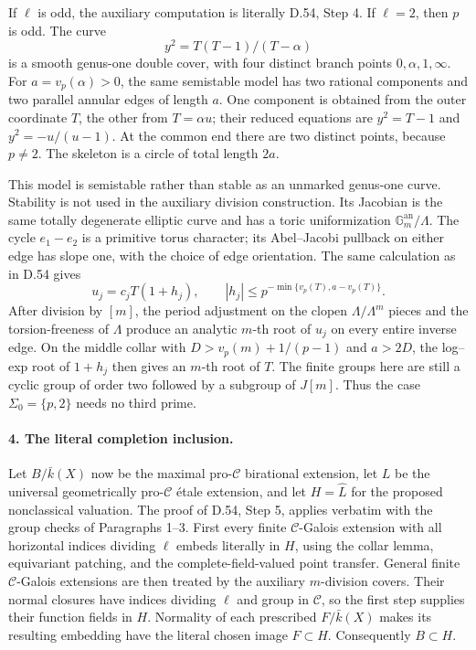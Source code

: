 If $\ell$ is odd, the auxiliary computation is literally D.54,
Step 4.  If $\ell=2$, then $p$ is odd.  The curve
\[
                    y^2=T(T-1)/(T-\alpha)
\]
is a smooth genus-one double cover, with four distinct branch
points $0,\alpha,1,\infty$.  For $a=v_p(\alpha)>0$, the same
semistable model has two rational components and two parallel
annular edges of length $a$.  One component is obtained from the
outer coordinate $T$, the other from $T=\alpha u$; their reduced
equations are $y^2=T-1$ and $y^2=-u/(u-1)$.  At the common end
there are two distinct points, because $p\ne2$.  The skeleton is
a circle of total length $2a$.

This model is semistable rather than stable as an unmarked
genus-one curve.  Stability is not used in the auxiliary division
construction.  Its Jacobian is the same totally degenerate
elliptic curve and has a toric uniformization
$\mathbb G_m^{\mathrm{an}}/\Lambda$.  The cycle $e_1-e_2$ is a
primitive torus character; its Abel--Jacobi pullback on either
edge has slope one, with the choice of edge orientation.  The
same calculation as in D.54 gives
\[
 u_j=c_jT(1+h_j),\qquad
 |h_j|\le p^{-\min\{v_p(T),a-v_p(T)\}}.
\]
After division by $[m]$, the period adjustment on the clopen
$\Lambda/\Lambda^m$ pieces and the torsion-freeness of $\Lambda$
produce an analytic $m$-th root of $u_j$ on every entire inverse
edge.  On the middle collar with
$D>v_p(m)+1/(p-1)$ and $a>2D$, the log--exp root of $1+h_j$
then gives an $m$-th root of $T$.  The finite groups here are
still a cyclic group of order two followed by a subgroup of
$J[m]$.  Thus the case $\Sigma_0=\{p,2\}$ needs no third prime.

\paragraph{4. The literal completion inclusion.}

Let $B/\bar k(X)$ now be the maximal pro-$\mathcal C$ birational
extension, let $L$ be the universal geometrically pro-$\mathcal C$
\'etale extension, and let $H=\widehat L$ for the proposed
nonclassical valuation.  The proof of D.54, Step 5, applies
verbatim with the group checks of Paragraphs 1--3.  First every
finite $\mathcal C$-Galois extension with all horizontal indices
dividing $\ell$ embeds literally in $H$, using the collar lemma,
equivariant patching, and the complete-field-valued point
transfer.  General finite $\mathcal C$-Galois extensions are then
treated by the auxiliary $m$-division covers.  Their normal
closures have indices dividing $\ell$ and group in $\mathcal C$,
so the first step supplies their function fields in $H$.
Normality of each prescribed $F/\bar k(X)$ makes its resulting
embedding have the literal chosen image $F\subset H$.
Consequently $B\subset H$.

